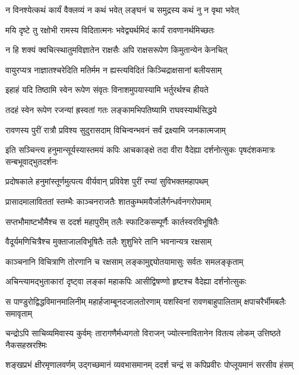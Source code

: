 \twolineshloka
{न विनश्येत्कथं कार्यं वैक्लव्यं न कथं भवेत्}
{लङ्घनं च समुद्रस्य कथं नु न वृथा भवेत्} %

\twolineshloka
{मयि दृष्टे तु रक्षोभी रामस्य विदितात्मनः}
{भवेद्व्यर्थमिदं कार्यं रावणानर्थमिच्छतः} %

\twolineshloka
{न हि शक्यं क्वचित्स्थातुमविज्ञातेन राक्षसैः}
{अपि राक्षसरूपेण किमुतान्येन केनचित्} %

\twolineshloka
{वायुरप्यत्र नाज्ञातश्चरेदिति मतिर्मम}
{न ह्यस्त्यविदितं किञ्चिद्राक्षसानां बलीयसाम्} %

\twolineshloka
{इहाहं यदि तिष्ठामि स्वेन रूपेण संवृतः}
{विनाशमुपयास्यामि भर्तुरर्थश्च हीयते} %

\twolineshloka
{तदहं स्वेन रूपेण रजन्यां ह्रस्वतां गतः}
{लङ्कामभिपतिष्यामि राघवस्यार्थसिद्धये} %

\twolineshloka
{रावणस्य पुरीं रात्रौ प्रविश्य सुदुरासदाम्}
{विचिन्वन्भवनं सर्वं द्रक्ष्यामि जनकात्मजाम्} %

\threelineshloka
{इति सञ्चिन्त्य हनुमान्सूर्यस्यास्तमयं कपिः}
{आचकाङ्क्षे तदा वीरा वैदेह्या दर्शनोत्सुकः}
{पृषदंशकमात्रः सन्बभूवाद्भुतदर्शनः} %

\twolineshloka
{प्रदोषकाले हनुमांस्तूर्णमुत्पत्य वीर्यवान्}
{प्रविवेश पुरीं रम्यां सुविभक्तमहापथम्} %

\twolineshloka
{प्रासादमालाविततां स्तम्भैः काञ्चनराजतैः}
{शातकुम्भमयैर्जालैर्गन्धर्वनगरोपमाम्} %

\twolineshloka
{सप्तभौमाष्टभौमैश्च स ददर्श महापुरीम्}
{तलैः स्फाटिकसम्पूर्णैः कार्तस्वरविभूषितैः} %

\twolineshloka
{वैदूर्यमणिचित्रैश्च मुक्ताजालविभूषितैः}
{तलैः शुशुभिरे तानि भवनान्यत्र रक्षसाम्} %

\twolineshloka
{काञ्चनानि विचित्राणि तोरणानि च रक्षसाम्}
{लङ्कामुद्द्योतयामासुः सर्वतः समलङ्कृताम्} %

\twolineshloka
{अचिन्त्यामद्भुताकारां दृष्ट्वा लङ्कां महाकपिः}
{आसीद्विषण्णो हृष्टश्च वैदेह्या दर्शनोत्सुकः} %

\fourlineindentedshloka
{स पाण्डुरोद्विद्धविमानमालिनीम्}
{महार्हजाम्बूनदजालतोरणाम्}
{यशस्विनां रावणबाहुपालिताम्}
{क्षपाचरैर्भीमबलैः समावृताम्} %

\fourlineindentedshloka
{चन्द्रोऽपि साचिव्यमिवास्य कुर्वम्ः}
{तारागणैर्मध्यगतो विराजन्}
{ज्योत्स्नावितानेन वितत्य लोकम्}
{उत्तिष्ठते नैकसहस्ररश्मिः} %

\fourlineindentedshloka
{शङ्खप्रभं क्षीरमृणालवर्णम्}
{उद्गच्छमानं व्यवभासमानम्}
{ददर्श चन्द्रं स कपिप्रवीरः}
{पोप्लूयमानं सरसीव हंसम्} %


